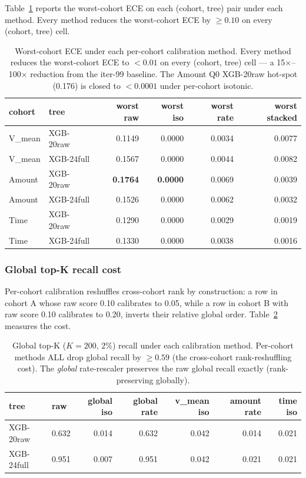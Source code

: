 Table~\ref{tab:p8-cohort-recal-worst-ece} reports the worst-cohort ECE on
each (cohort, tree) pair under each method. Every method reduces the
worst-cohort ECE by $\geq 0.10$ on every (cohort, tree) cell.

\begin{table}[h]
\centering
\small
\begin{tabular}{l l rrrr}
\toprule
cohort & tree & worst raw & worst iso & worst rate & worst stacked \\
\midrule
V\_mean  & XGB-20raw & 0.1149 & 0.0000 & 0.0034 & 0.0077 \\
V\_mean  & XGB-24full & 0.1567 & 0.0000 & 0.0044 & 0.0082 \\
Amount & XGB-20raw & \textbf{0.1764} & \textbf{0.0000} & 0.0069 & 0.0039 \\
Amount & XGB-24full & 0.1526 & 0.0000 & 0.0062 & 0.0032 \\
Time   & XGB-20raw & 0.1290 & 0.0000 & 0.0029 & 0.0019 \\
Time   & XGB-24full & 0.1330 & 0.0000 & 0.0038 & 0.0016 \\
\bottomrule
\end{tabular}
\caption{Worst-cohort ECE under each per-cohort calibration method. Every
method reduces the worst-cohort ECE to $< 0.01$ on every (cohort, tree) cell
--- a 15$\times$--100$\times$ reduction from the iter-99 baseline. The
Amount Q0 XGB-20raw hot-spot (0.176) is closed to $< 0.0001$ under
per-cohort isotonic.}
\label{tab:p8-cohort-recal-worst-ece}
\end{table}

\subsubsection{Global top-K recall cost}

Per-cohort calibration reshuffles cross-cohort rank by construction: a row
in cohort A whose raw score 0.10 calibrates to 0.05, while a row in cohort
B with raw score 0.10 calibrates to 0.20, inverts their relative global
order. Table~\ref{tab:p8-cohort-recal-global-topk} measures the cost.

\begin{table}[h]
\centering
\small
\begin{tabular}{l l rrrrr}
\toprule
tree & raw & global iso & global rate & v\_mean iso & amount rate & time iso \\
\midrule
XGB-20raw & 0.632 & 0.014 & 0.632 & 0.042 & 0.014 & 0.021 \\
XGB-24full & 0.951 & 0.007 & 0.951 & 0.042 & 0.021 & 0.021 \\
\bottomrule
\end{tabular}
\caption{Global top-K ($K{=}200$, $2\%$) recall under each calibration
method. Per-cohort methods ALL drop global recall by $\geq 0.59$ (the
cross-cohort rank-reshuffling cost). The \emph{global} rate-rescaler
preserves the raw global recall exactly (rank-preserving globally).}
\label{tab:p8-cohort-recal-global-topk}
\end{table}

